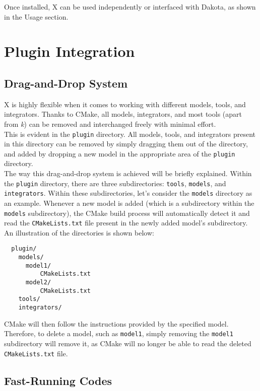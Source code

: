 \documentclass[a4paper,12pt]{article}
\begin{document}
Once installed, X can be used independently or interfaced with Dakota, as shown in the Usage section.

\section{Plugin Integration}

\subsection{Drag-and-Drop System}

X is highly flexible when it comes to working with different models, tools, and integrators. Thanks to CMake, all models, integrators, and most tools (apart from \textit{k}) can be removed and interchanged freely with minimal effort. \\

This is evident in the \texttt{plugin} directory. All models, tools, and integrators present in this directory can be removed by simply dragging them out of the directory, and added by dropping a new model in the appropriate area of the \texttt{plugin} directory.\\ 

The way this drag-and-drop system is achieved will be briefly explained. Within the \texttt{plugin} directory, there are three subdirectories: \texttt{tools}, \texttt{models}, and \texttt{integrators}. Within these subdirectories, let's consider the \texttt{models} directory as an example. Whenever a new model is added (which is a subdirectory within the \texttt{models} subdirectory), the CMake build process will automatically detect it and read the \texttt{CMakeLists.txt} file present in the newly added model's subdirectory. \\

An illustration of the directories is shown below:

\begin{verbatim}
  plugin/
    models/
      model1/
          CMakeLists.txt
      model2/
          CMakeLists.txt
    tools/
    integrators/
\end{verbatim}

CMake will then follow the instructions provided by the specified model. Therefore, to delete a model, such as \texttt{model1}, simply removing the \texttt{model1} subdirectory will remove it, as CMake will no longer be able to read the deleted \texttt{CMakeLists.txt} file.

\subsection{Fast-Running Codes}
\end{document}
